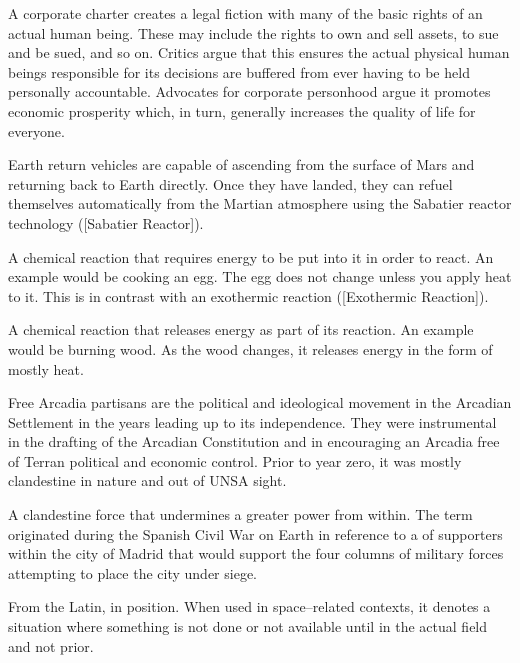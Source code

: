A corporate charter creates a legal fiction with many of the basic rights of an actual human being. These may include the rights to own and sell assets, to sue and be sued, and so on. Critics argue that this ensures the actual physical human beings responsible for its decisions are buffered from ever having to be held personally accountable. Advocates for corporate personhood argue it promotes economic prosperity which, in turn, generally increases the quality of life for everyone.

Earth return vehicles are capable of ascending from the surface of Mars and returning back to Earth directly. Once they have landed, they can refuel themselves automatically from the Martian atmosphere using the Sabatier reactor technology ([Sabatier Reactor]).

A chemical reaction that requires energy to be put into it in order to react. An example would be cooking an egg. The egg does not change unless you apply heat to it. This is in contrast with an exothermic reaction ([Exothermic Reaction]).

A chemical reaction that releases energy as part of its reaction. An example would be burning wood. As the wood changes, it releases energy in the form of mostly heat.

Free Arcadia partisans are the political and ideological movement in the Arcadian Settlement in the years leading up to its independence. They were instrumental in the drafting of the Arcadian Constitution and in encouraging an Arcadia free of Terran political and economic control. Prior to year zero, it was mostly clandestine in nature and out of UNSA sight.

A clandestine force that undermines a greater power from within. The term originated during the Spanish Civil War on Earth in reference to a  of supporters within the city of Madrid that would support the four columns of military forces attempting to place the city under siege.

From the Latin, in position. When used in space--related contexts, it denotes a situation where something is not done or not available until in the actual field and not prior.

